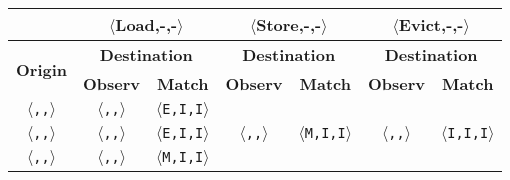 \begin{tabular}{|c|c|c|c|c|c|c|}
\cline{2-7}
\multicolumn{1}{c|}{}
 & \multicolumn{2}{c|}{\textbf{$\langle{}$Load,-,-$\rangle{}$}}
 & \multicolumn{2}{c|}{\textbf{$\langle{}$Store,-,-$\rangle{}$}}
 & \multicolumn{2}{c|}{\textbf{$\langle{}$Evict,-,-$\rangle{}$}}
\\
\hline
   \multirow{2}{*}{\textbf{Origin}}
 & \multicolumn{2}{c|}{\textbf{Destination}}
 & \multicolumn{2}{c|}{\textbf{Destination}}
 & \multicolumn{2}{c|}{\textbf{Destination}}
\\
 & \textbf{Observ}
 & \textbf{Match}
 & \textbf{Observ}
 & \textbf{Match}
 & \textbf{Observ}
 & \textbf{Match}
\\
\hline

\texttt{$\langle$\benchi{},\benchi{},\benchi{}$\rangle$}

& \texttt{$\langle$\benche{},\benchi{},\benchi{}$\rangle$}
& \texttt{$\langle$E,I,I$\rangle$}

& \multirow{16}{*}{\texttt{$\langle$\benchm{},\benchi{},\benchi{}$\rangle$}}
& \multirow{16}{*}{\texttt{$\langle$M,I,I$\rangle$}}

& \multirow{3}{*}{\texttt{$\langle$\benchi{},\benchi{},\benchi{}$\rangle$}}
& \multirow{3}{*}{\texttt{$\langle$I,I,I$\rangle$}}
\\
\cline{1-3}

\texttt{$\langle$\benche{},\benchi{},\benchi{}$\rangle$}

& \texttt{$\langle$\benche{},\benchi{},\benchi{}$\rangle$}
& \texttt{$\langle$E,I,I$\rangle$}

&
&

&%
&%
\\
\cline{1-3}

\texttt{$\langle$\benchm{},\benchi{},\benchi{}$\rangle$}

& \texttt{$\langle$\benchm{},\benchi{},\benchi{}$\rangle$}
& \texttt{$\langle$M,I,I$\rangle$}


\end{tabular}
